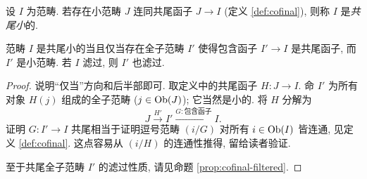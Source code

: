 \begin{definition}
	设 $I$ 为范畴. 若存在小范畴 $J$ 连同共尾函子 $J \to I$ (定义 \ref{def:cofinal}), 则称 $I$ 是\emph{共尾小}的.
\end{definition}

\begin{lemma}\label{prop:cofinally-small-sub}
	范畴 $I$ 是共尾小的当且仅当存在全子范畴 $I'$ 使得包含函子 $I' \to I$ 是共尾函子, 而 $I'$ 是小范畴. 若 $I$ 滤过, 则 $I'$ 也滤过.
\end{lemma}
\begin{proof}
	说明``仅当''方向和后半部即可. 取定义中的共尾函子 $H: J \to I$. 命 $I'$ 为所有对象 $H(j)$ 组成的全子范畴 ($j \in \operatorname{Ob}(J)$); 它当然是小的. 将 $H$ 分解为
	\[ J \xrightarrow{H'} I' \xrightarrow{G: \text{包含函子}} I. \]
	证明 $G: I' \to I$ 共尾相当于证明逗号范畴 $(i/G)$ 对所有 $i \in \operatorname{Ob}(I)$ 皆连通, 见定义 \ref{def:cofinal}. 这点容易从 $(i/H)$ 的连通性推得, 留给读者验证.
	
	至于共尾全子范畴 $I'$ 的滤过性质, 请见命题 \ref{prop:cofinal-filtered}.
\end{proof}

